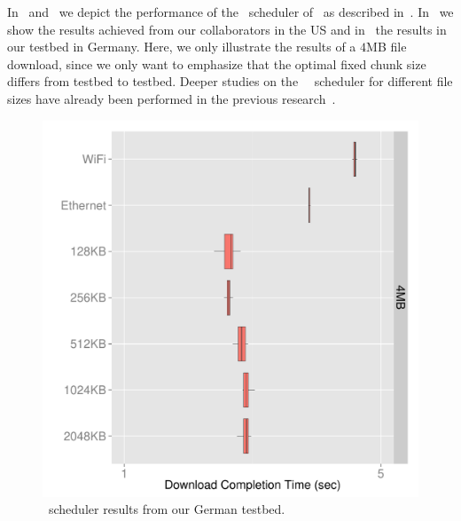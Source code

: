 In~ and~ we depict the performance of the \algbase~scheduler of \protoold~as described in~. 
In~ we show the results achieved from our collaborators in the US and in~ the results in our testbed in Germany. 
Here, we only illustrate the results of a $4$MB file download, since we only want to emphasize that the optimal fixed chunk size differs from testbed to testbed. 
Deeper studies on the \protoold~\algbase~scheduler for different file sizes have already been performed in the previous research~\cite{KIM13-MHTTP}.

\begin{figure}[!htb]
    \begin{minipage}[t]{0.8\linewidth}
    \begin{center}
        \includegraphics[width=\linewidth]{Figures/baseline-scheduler-de-testbed-4M.pdf}
		\caption{\label{fig:evaluation-baseline-de}\algbase~scheduler results from our German testbed.}
    \end{center}
    \end{minipage}
  \vspace*{-0.3cm}
\end{figure}

 

